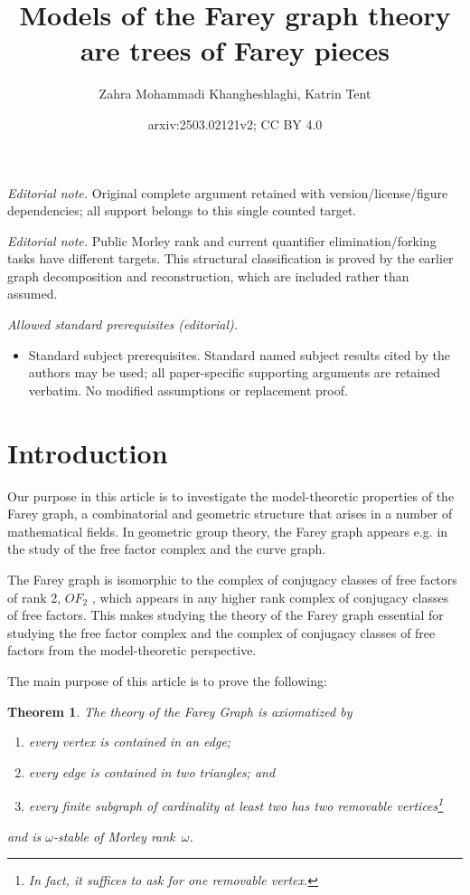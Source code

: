 \documentclass[10pt,a4paper]{amsart}
\title{Models of the Farey graph theory are trees of Farey pieces}
\author{Zahra Mohammadi Khangheshlaghi, Katrin Tent}
\date{arxiv:2503.02121v2; CC BY 4.0}
\newtheorem{theorem}[defi]{Theorem}
\begin{document}
\maketitle
\noindent\textit{Editorial note.} Original complete argument retained with version/license/figure dependencies; all support belongs to this single counted target.\par\medskip
\noindent\textit{Editorial note.} Public Morley rank and current quantifier elimination/forking tasks have different targets. This structural classification is proved by the earlier graph decomposition and reconstruction, which are included rather than assumed.\par\medskip
\noindent\textit{Allowed standard prerequisites (editorial).}\begin{itemize}
\item Standard subject prerequisites. Standard named subject results cited by the authors may be used; all paper-specific supporting arguments are retained verbatim. No modified assumptions or replacement proof.
\end{itemize}\medskip
\section{Introduction}



Our purpose in this article is to investigate the model-theoretic properties of the Farey graph, 
a combinatorial and geometric structure that arises in a number of mathematical fields. 
In geometric group theory, the Farey graph appears e.g. in the study of the free factor complex and the curve graph.

The Farey graph is isomorphic to the complex of conjugacy classes of free factors of rank 2, $OF_2$ \cite{Free_factor_complex_rigidity}, which appears 
in any higher rank complex of conjugacy classes of free factors. This makes studying the theory of the Farey graph essential 
for studying the free factor complex and the complex of conjugacy classes of free factors from the model-theoretic perspective.



The main purpose of this article is to prove the following:

\begin{theorem} \label{main_th}
    The theory of the Farey Graph is axiomatized by
\begin{enumerate}
\item every vertex is contained in an edge;
\item every edge is contained in two triangles; and

\item every finite subgraph of cardinality at least two has two removable vertices\footnote{In fact, it suffices to ask for one removable vertex.}
\end{enumerate}
and   is $\omega$-stable of Morley rank~$\omega$.
\end{theorem}
\end{document}
